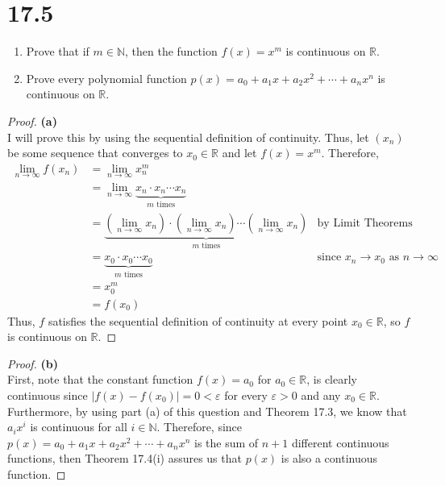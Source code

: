 \documentclass[10pt,a4paper]{article}
\theoremstyle{definition}
\begin{document}
\section*{17.5}
\begin{enumerate}[label = (\alph*)]
\item Prove that if $m \in \mathbb{N}$, then the function $f(x) = x^m$ is continuous on $\mathbb{R}$.
\item Prove every polynomial function $p(x) = a_0 + a_1 x + a_2 x^2 + \cdots + a_n x^n$ is continuous on $\mathbb{R}$.
\end{enumerate}

\begin{proof}{\textbf{(a)}}
\\I will prove this by using the sequential definition of continuity. Thus, let $(x_n)$ be some sequence that converges to $x_0 \in \mathbb{R}$ and let $f(x) = x^m$. Therefore, 
\begin{align*}
\lim_{n \to \infty} f(x_n) &= \lim_{n \to \infty} x_n^m\\
&= \lim_{n \to \infty} \underbrace{x_n \cdot x_n \cdots x_n}_{m \text{ times}}\\
&= \underbrace{\left(\lim_{n \to \infty} x_n\right) \cdot \left(\lim_{n \to \infty} x_n \right) \cdots \left(\lim_{n \to \infty} x_n \right)}_{m \text{ times}} &\text{by Limit Theorems}\\
&= \underbrace{x_0 \cdot x_0 \cdots x_0}_{m \text{ times}} &\text{since $x_n \to x_0$ as $n \to \infty$}\\
&= x_0^m\\
&= f(x_0)
\end{align*}
Thus, $f$ satisfies the sequential definition of continuity at every point $x_0 \in \mathbb{R}$, so $f$ is continuous on $\mathbb{R}$.
\end{proof}

\begin{proof}{\textbf{(b)}}
\\First, note that the constant function $f(x) = a_0$ for $a_0 \in \mathbb{R}$, is clearly continuous since $|f(x) - f(x_0)| = 0 < \varepsilon$ for every $\varepsilon > 0$ and any $x_0 \in \mathbb{R}$. Furthermore, by using part (a) of this question and Theorem 17.3, we know that $a_ix^i$ is continuous for all $i \in \mathbb{N}$. Therefore, since $p(x) = a_0 + a_1x + a_2x^2 + \cdots + a_nx^n$ is the sum of $n+1$ different continuous functions, then Theorem 17.4(i) assures us that $p(x)$ is also a continuous function. 
\end{proof}
\end{document}
